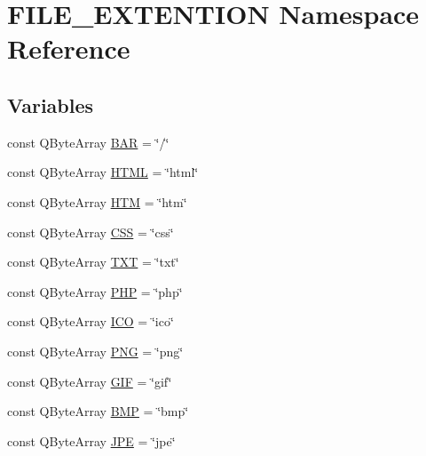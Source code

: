 \hypertarget{namespace_f_i_l_e___e_x_t_e_n_t_i_o_n}{}\section{F\+I\+L\+E\+\_\+\+E\+X\+T\+E\+N\+T\+I\+ON Namespace Reference}
\label{namespace_f_i_l_e___e_x_t_e_n_t_i_o_n}
\subsection*{Variables}
\begin{DoxyCompactItemize}
\item 
const Q\+Byte\+Array \hyperlink{namespace_f_i_l_e___e_x_t_e_n_t_i_o_n_ae92d4d0dd25f9c6b9ee0235fd02a6150}{B\+AR} = \char`\"{}/\char`\"{}
\item 
const Q\+Byte\+Array \hyperlink{namespace_f_i_l_e___e_x_t_e_n_t_i_o_n_afe4c3180d6a928f369fae7394248835b}{H\+T\+ML} = \char`\"{}html\char`\"{}
\item 
const Q\+Byte\+Array \hyperlink{namespace_f_i_l_e___e_x_t_e_n_t_i_o_n_a94689862cc51816c8156d11198ae5439}{H\+TM} = \char`\"{}htm\char`\"{}
\item 
const Q\+Byte\+Array \hyperlink{namespace_f_i_l_e___e_x_t_e_n_t_i_o_n_ad553100c108a370ce52e00f617472471}{C\+SS} = \char`\"{}css\char`\"{}
\item 
const Q\+Byte\+Array \hyperlink{namespace_f_i_l_e___e_x_t_e_n_t_i_o_n_a2c6c52143513fc804a6093764ba35c5a}{T\+XT} = \char`\"{}txt\char`\"{}
\item 
const Q\+Byte\+Array \hyperlink{namespace_f_i_l_e___e_x_t_e_n_t_i_o_n_af353f3f9754d0f5e1fe5d867683d8619}{P\+HP} = \char`\"{}php\char`\"{}
\item 
const Q\+Byte\+Array \hyperlink{namespace_f_i_l_e___e_x_t_e_n_t_i_o_n_a6f7a7b2231d57f60ab86036de040fb73}{I\+CO} = \char`\"{}ico\char`\"{}
\item 
const Q\+Byte\+Array \hyperlink{namespace_f_i_l_e___e_x_t_e_n_t_i_o_n_a1b8fe7e4d2a7b0bde7532ed3eb7c376f}{P\+NG} = \char`\"{}png\char`\"{}
\item 
const Q\+Byte\+Array \hyperlink{namespace_f_i_l_e___e_x_t_e_n_t_i_o_n_aeb8b6556d10b767037bfb8bcecd1a40f}{G\+IF} = \char`\"{}gif\char`\"{}
\item 
const Q\+Byte\+Array \hyperlink{namespace_f_i_l_e___e_x_t_e_n_t_i_o_n_a2a180b8ac1811a1dfba68aa60b82fd10}{B\+MP} = \char`\"{}bmp\char`\"{}
\item 
const Q\+Byte\+Array \hyperlink{namespace_f_i_l_e___e_x_t_e_n_t_i_o_n_a05ab50f1b78c6a8d905dad1cca805649}{J\+PE} = \char`\"{}jpe\char`\"{}

\end{DoxyCompactItemize}
